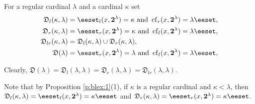 \documentclass[preprint]{elsarticle}
\def\la{\lambda}
\def\ka{\kappa}
\def\set#1{\bbset#1\eeset}
\def\bbset#1:#2\eeset{\{#1\,:\,#2\}}
\theoremstyle{definition}
\theoremstyle{remark}
\def\cf{\operatorname{cf}}
\def\lex#1#2{\mathfrak{L}(#2^{#1})}
\def\lex#1#2{#2^{#1}}
\def\homg#1,#2#3{\mathfrak{D}_{#1}(#2,#3)}
\def\homm#1{{\mathfrak{D}(#1)}}
\def\B{2}
\def\B{\mathsf{2}}
\def\B{\mathbf{2}}
\def\lexab{\lex\la\B}
\begin{document}
For a regular cardinal $\la$ and a cardinal $\ka$ set
\begin{align*}
\homg l,\ka\la &= \set{ x\in \lexab: \cf_l(x,\lexab) = \ka \text{ and } \cf_r(x,\lexab) = \la},
\\
\homg r,\ka\la &= \set{ x\in \lexab: \cf_r(x,\lexab) = \ka  \text{ and } \cf_l(x,\lexab) = \la},
\\
\homg lr,\ka\la &= \homg l,\ka\la \cup \homg r,\ka\la,
\\
\homm\la &= \set{ x\in \lexab: \cf_r(x,\lexab) = \la  \text{ and } \cf_l(x,\lexab) = \la},
\end{align*}

Clearly, $\homm\la = \homg l,\la\la = \homg r,\la\la = \homg lr,\la\la$.

Note that by Proposition \ref{p:blex:1}(1), if $\ka$ is a regular cardinal and $\ka<\la$, then $\homg l,\ka\la = \set{ x\in \lexab: \cf_l(x,\lexab) = \ka}$ and $\homg r,\ka\la = \set{ x\in \lexab: \cf_r(x,\lexab) = \ka}$.
\end{document}
